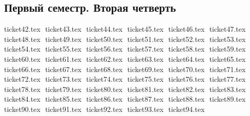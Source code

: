 \documentclass[12pt,letterpaper]{report}
\theoremstyle{definition}
\begin{document}
\tableofcontents
\newpage
\begin{normalsize}
\setcounter{section}{41}
\chapter*{Первый семестр. Вторая четверть}
{ticket42.tex}
$ $
{ticket43.tex}
$ $
{ticket44.tex}
$ $
{ticket45.tex}
$ $
{ticket46.tex}
$ $
{ticket47.tex}
$ $
{ticket48.tex}
$ $
{ticket49.tex}
$ $
{ticket50.tex}
$ $
{ticket51.tex}
$ $
{ticket52.tex}
$ $
{ticket53.tex}
$ $
{ticket54.tex}
$ $
{ticket55.tex}
$ $
{ticket56.tex}
$ $
{ticket57.tex}
$ $
{ticket58.tex}
$ $
{ticket59.tex}
$ $
{ticket60.tex}
$ $
{ticket61.tex}
$ $
{ticket62.tex}
$ $
{ticket63.tex}
$ $
{ticket64.tex}
$ $
{ticket65.tex}
$ $
{ticket66.tex}
$ $
{ticket67.tex}
$ $
{ticket68.tex}
$ $
{ticket69.tex}
$ $
{ticket70.tex}
$ $
{ticket71.tex}
$ $
{ticket72.tex}
$ $
{ticket73.tex}
$ $
{ticket74.tex}
$ $
{ticket75.tex}
$ $
{ticket76.tex}
$ $
{ticket77.tex}
$ $
{ticket78.tex}
$ $
{ticket79.tex}
$ $
{ticket80.tex}
$ $
{ticket81.tex}
$ $
{ticket82.tex}
$ $
{ticket83.tex}
$ $
{ticket84.tex}
$ $
{ticket85.tex}
$ $
{ticket86.tex}
$ $
{ticket87.tex}
$ $
{ticket88.tex}
$ $
{ticket89.tex}
$ $
{ticket90.tex}
$ $
{ticket91.tex}
$ $
{ticket92.tex}
$ $
{ticket93.tex}
$ $
{ticket94.tex}
$ $
\end{normalsize}
\end{document}
